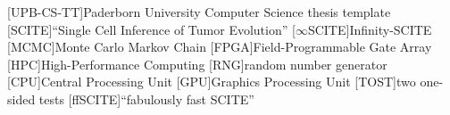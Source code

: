 \theoremstyle{definition}
\newtheorem{definition}{Definition}[chapter]
\newtheorem{example}[definition]{Example}

\theoremstyle{plain}
\newtheorem{lemma}[definition]{Lemma}
\newtheorem{theorem}[definition]{Theorem}
\newtheorem{corollary}[definition]{Corollary}


\newcommand*{\eg}{e.\,g.}
\newcommand*{\ie}{i.\,e.}
\newcommand*{\cf}{c.\,f.}
\newcommand*{\etal}{et~al.}

[UPB-CS-TT]{Paderborn University Computer Science thesis template}
[SCITE]{``Single Cell Inference of Tumor Evolution''}
[$\infty$SCITE]{Infinity-SCITE}
[MCMC]{Monte Carlo Markov Chain}
[FPGA]{Field-Programmable Gate Array}
[HPC]{High-Performance Computing}
[RNG]{random number generator}
[CPU]{Central Processing Unit}
[GPU]{Graphics Processing Unit}
[TOST]{two one-sided tests}
[ffSCITE]{``fabulously fast SCITE''}

\DeclareMathOperator*{\argmax}{arg\,max}
\DeclareMathOperator*{\argmin}{arg\,min}
